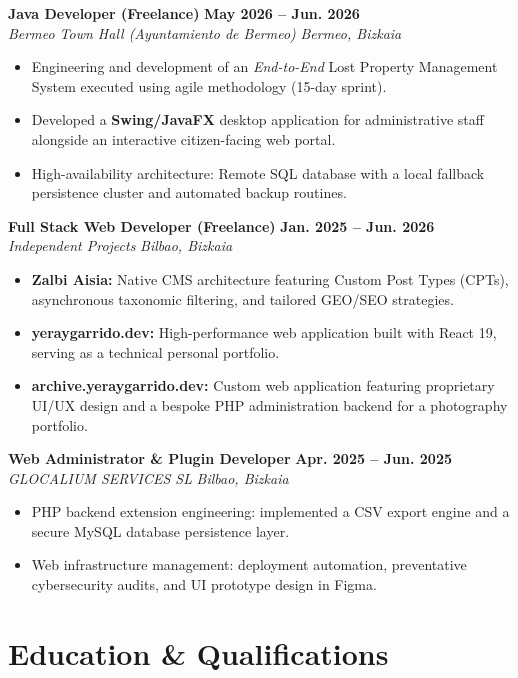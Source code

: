 \documentclass[a4paper,10pt]{article}
\newcommand{\jobheader}[4]{
    \noindent\textbf{#1} \hfill \textbf{#2} \\
    \textit{#3} \hfill \textit{#4} \vspace{3pt}
}
\begin{document}
\jobheader{Java Developer (Freelance)}{May 2026 -- Jun. 2026}{Bermeo Town Hall (Ayuntamiento de Bermeo)}{Bermeo, Bizkaia}
\begin{itemize}[leftmargin=12pt, itemsep=3pt, topsep=4pt]
    \item Engineering and development of an \textit{End-to-End} Lost Property Management System executed using agile methodology (15-day sprint).
    \item Developed a \textbf{Swing/JavaFX} desktop application for administrative staff alongside an interactive citizen-facing web portal.
    \item High-availability architecture: Remote SQL database with a local fallback persistence cluster and automated backup routines.
\end{itemize}

\jobheader{Full Stack Web Developer (Freelance)}{Jan. 2025 -- Jun. 2026}{Independent Projects}{Bilbao, Bizkaia}
\begin{itemize}[leftmargin=12pt, itemsep=3pt, topsep=4pt]
    \item \textbf{Zalbi Aisia:} Native CMS architecture featuring Custom Post Types (CPTs), asynchronous taxonomic filtering, and tailored GEO/SEO strategies.
    \item \textbf{yeraygarrido.dev:} High-performance web application built with React 19, serving as a technical personal portfolio.
    \item \textbf{archive.yeraygarrido.dev:} Custom web application featuring proprietary UI/UX design and a bespoke PHP administration backend for a photography portfolio.
\end{itemize}

\jobheader{Web Administrator \& Plugin Developer}{Apr. 2025 -- Jun. 2025}{GLOCALIUM SERVICES SL}{Bilbao, Bizkaia}
\begin{itemize}[leftmargin=12pt, itemsep=3pt, topsep=4pt]
    \item PHP backend extension engineering: implemented a CSV export engine and a secure MySQL database persistence layer.
    \item Web infrastructure management: deployment automation, preventative cybersecurity audits, and UI prototype design in Figma.
\end{itemize}

\section{Education \& Qualifications}
\end{document}
